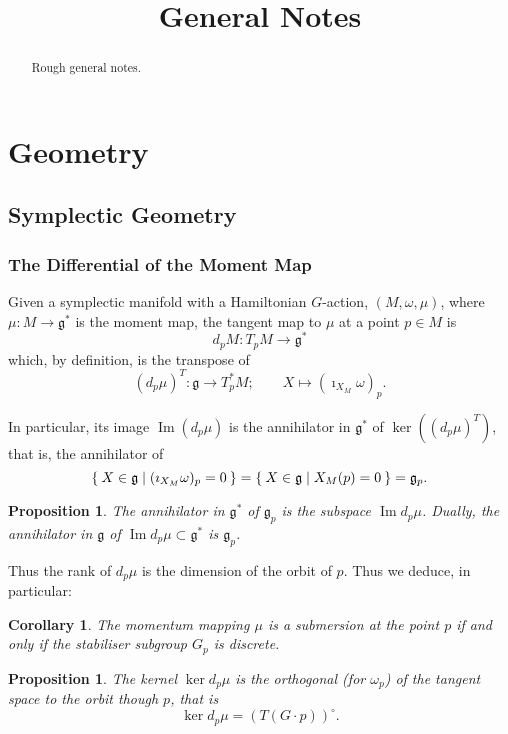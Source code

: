 \documentclass{article}
\title{General Notes}
\date{}	%
\newtheorem{prop}[theorem]{Proposition}
\newtheorem{corollary}[theorem]{Corollary}
\newcommand{\ra}{\rightarrow}
\newcommand{\lra}{\longrightarrow}
\newcommand{\w}{\omega}
\newcommand{\mfg}{\mathfrak{g}}
\DeclareMathOperator{\Image}{Im}
\begin{document}
	\maketitle
	
	\begin{abstract}
		Rough general notes.
	\end{abstract}

	\section{Geometry}
	
	\subsection{Symplectic Geometry}
	
	\subsubsection{The Differential of the Moment Map}
	
	Given a symplectic manifold with a Hamiltonian $G$-action, $(M, \w, \mu)$, where $\mu : M \ra \mfg^{\ast}$ is the moment map, the tangent map to $\mu$ at a point $p \in M$ is
	\[
	d_{p}M : T_{p}M \lra \mfg^{\ast}	
	\]
	which, by definition, is the transpose of
	\[
		\left(d_{p}\mu\right)^{T} : \mfg \lra T_{p}^{\ast}M; \qquad X \longmapsto \left(\imath_{X_{M}} \w  \right)_{p}.
	\]
	
	In particular, its image $\Image(d_{p}\mu)$ is the annihilator in $\mfg^{\ast}$ of $\ker\left((d_{p}\mu)^{T}\right)$, that is, the annihilator of 
	\[
		\Set{X \in \mfg | (\imath_{X_{M}}\w)_{p} = 0} = \Set{X \in \mfg | X_{M}(p) = 0 } = \mfg_{p}.
	\]
	
	\begin{prop}
		The annihilator in $\mfg^{\ast}$ of $\mfg_{p}$ is the subspace $\Image d_{p}\mu$. Dually, the annihilator in $\mfg$ of $\Image d_{p}\mu \subset \mfg^{\ast}$ is $\mfg_{p}$.
	\end{prop}
	
	Thus the rank of $d_{p}\mu$ is the dimension of the orbit of $p$. Thus we deduce, in particular:
	
	\begin{corollary}
		The momentum mapping $\mu$ is a submersion at the point $p$ if and only if the stabiliser subgroup $G_{p}$ is discrete.
	\end{corollary}
	
	\begin{prop}
		The kernel $\ker d_{p}\mu$ is the orthogonal (for $\w_{p}$) of the tangent space to the orbit though $p$, that is
		\[
			\ker d_{p}\mu = \left( T(G \cdot p) \right)^{\circ}.
		\]
	\end{prop}
	
\end{document}
